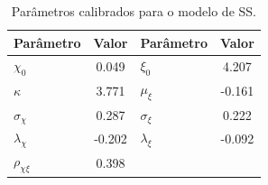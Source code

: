\begin{table}[H]
\centering
\caption{Parâmetros calibrados para o modelo de SS.}
\label{tab:2.3}
\begin{tabular}{lclc}
\hline
\textbf{Parâmetro} & \textbf{Valor} & \textbf{Parâmetro} & \textbf{Valor} \\ \hline
$\chi_0$ & 0.049 & $\xi_0$ & 4.207 \\
$\kappa$ & 3.771 & $\mu_\xi$ & -0.161 \\
$\sigma_\chi$ & 0.287 & $\sigma_\xi$ & 0.222 \\
$\lambda_\chi$ & -0.202 & $\lambda_\xi$ & -0.092 \\
$\rho_{\chi\xi}$ & 0.398 & & \\ \hline
\end{tabular}
\end{table}